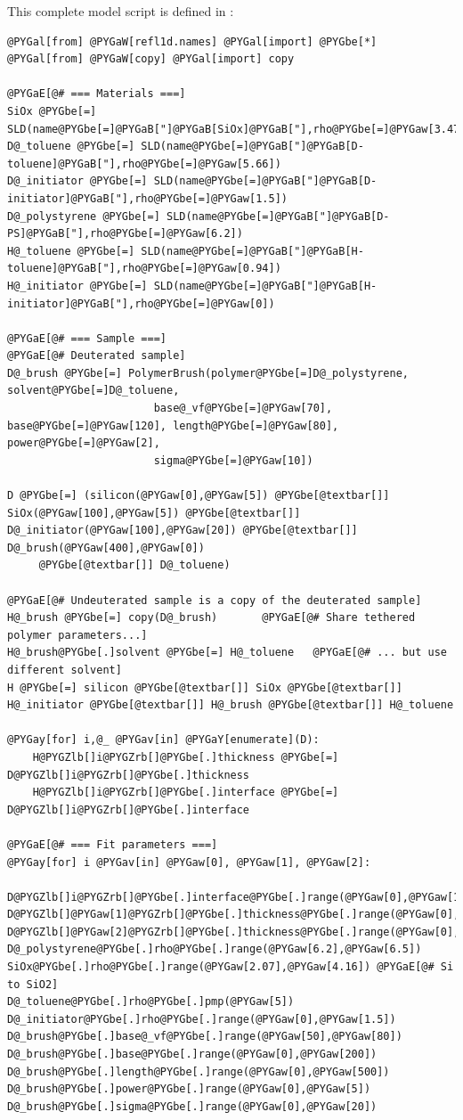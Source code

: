 \documentclass[letterpaper,10pt,english]{sphinxmanual}
\begin{document}
This complete model script is defined in
:

\begin{Verbatim}[commandchars=@\[\]]
@PYGal[from] @PYGaW[refl1d.names] @PYGal[import] @PYGbe[*]
@PYGal[from] @PYGaW[copy] @PYGal[import] copy

@PYGaE[@# === Materials ===]
SiOx @PYGbe[=] SLD(name@PYGbe[=]@PYGaB["]@PYGaB[SiOx]@PYGaB["],rho@PYGbe[=]@PYGaw[3.47])
D@_toluene @PYGbe[=] SLD(name@PYGbe[=]@PYGaB["]@PYGaB[D-toluene]@PYGaB["],rho@PYGbe[=]@PYGaw[5.66])
D@_initiator @PYGbe[=] SLD(name@PYGbe[=]@PYGaB["]@PYGaB[D-initiator]@PYGaB["],rho@PYGbe[=]@PYGaw[1.5])
D@_polystyrene @PYGbe[=] SLD(name@PYGbe[=]@PYGaB["]@PYGaB[D-PS]@PYGaB["],rho@PYGbe[=]@PYGaw[6.2])
H@_toluene @PYGbe[=] SLD(name@PYGbe[=]@PYGaB["]@PYGaB[H-toluene]@PYGaB["],rho@PYGbe[=]@PYGaw[0.94])
H@_initiator @PYGbe[=] SLD(name@PYGbe[=]@PYGaB["]@PYGaB[H-initiator]@PYGaB["],rho@PYGbe[=]@PYGaw[0])

@PYGaE[@# === Sample ===]
@PYGaE[@# Deuterated sample]
D@_brush @PYGbe[=] PolymerBrush(polymer@PYGbe[=]D@_polystyrene, solvent@PYGbe[=]D@_toluene,
                       base@_vf@PYGbe[=]@PYGaw[70], base@PYGbe[=]@PYGaw[120], length@PYGbe[=]@PYGaw[80], power@PYGbe[=]@PYGaw[2],
                       sigma@PYGbe[=]@PYGaw[10])

D @PYGbe[=] (silicon(@PYGaw[0],@PYGaw[5]) @PYGbe[@textbar[]] SiOx(@PYGaw[100],@PYGaw[5]) @PYGbe[@textbar[]] D@_initiator(@PYGaw[100],@PYGaw[20]) @PYGbe[@textbar[]] D@_brush(@PYGaw[400],@PYGaw[0])
     @PYGbe[@textbar[]] D@_toluene)

@PYGaE[@# Undeuterated sample is a copy of the deuterated sample]
H@_brush @PYGbe[=] copy(D@_brush)       @PYGaE[@# Share tethered polymer parameters...]
H@_brush@PYGbe[.]solvent @PYGbe[=] H@_toluene   @PYGaE[@# ... but use different solvent]
H @PYGbe[=] silicon @PYGbe[@textbar[]] SiOx @PYGbe[@textbar[]] H@_initiator @PYGbe[@textbar[]] H@_brush @PYGbe[@textbar[]] H@_toluene

@PYGay[for] i,@_ @PYGav[in] @PYGaY[enumerate](D):
    H@PYGZlb[]i@PYGZrb[]@PYGbe[.]thickness @PYGbe[=] D@PYGZlb[]i@PYGZrb[]@PYGbe[.]thickness
    H@PYGZlb[]i@PYGZrb[]@PYGbe[.]interface @PYGbe[=] D@PYGZlb[]i@PYGZrb[]@PYGbe[.]interface

@PYGaE[@# === Fit parameters ===]
@PYGay[for] i @PYGav[in] @PYGaw[0], @PYGaw[1], @PYGaw[2]:
    D@PYGZlb[]i@PYGZrb[]@PYGbe[.]interface@PYGbe[.]range(@PYGaw[0],@PYGaw[100])
D@PYGZlb[]@PYGaw[1]@PYGZrb[]@PYGbe[.]thickness@PYGbe[.]range(@PYGaw[0],@PYGaw[200])
D@PYGZlb[]@PYGaw[2]@PYGZrb[]@PYGbe[.]thickness@PYGbe[.]range(@PYGaw[0],@PYGaw[200])
D@_polystyrene@PYGbe[.]rho@PYGbe[.]range(@PYGaw[6.2],@PYGaw[6.5])
SiOx@PYGbe[.]rho@PYGbe[.]range(@PYGaw[2.07],@PYGaw[4.16]) @PYGaE[@# Si to SiO2]
D@_toluene@PYGbe[.]rho@PYGbe[.]pmp(@PYGaw[5])
D@_initiator@PYGbe[.]rho@PYGbe[.]range(@PYGaw[0],@PYGaw[1.5])
D@_brush@PYGbe[.]base@_vf@PYGbe[.]range(@PYGaw[50],@PYGaw[80])
D@_brush@PYGbe[.]base@PYGbe[.]range(@PYGaw[0],@PYGaw[200])
D@_brush@PYGbe[.]length@PYGbe[.]range(@PYGaw[0],@PYGaw[500])
D@_brush@PYGbe[.]power@PYGbe[.]range(@PYGaw[0],@PYGaw[5])
D@_brush@PYGbe[.]sigma@PYGbe[.]range(@PYGaw[0],@PYGaw[20])


\end{Verbatim}
\end{document}
